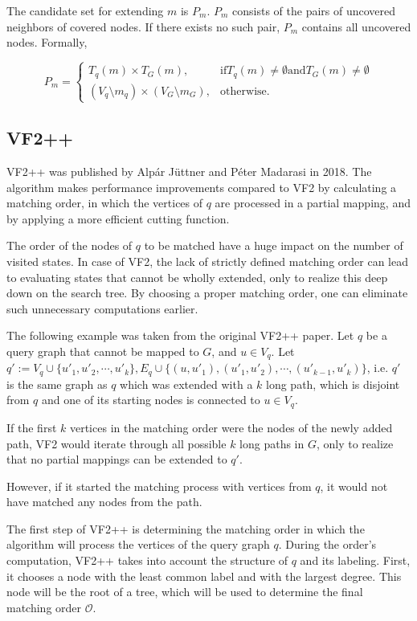 The candidate set for extending $m$ is $P_m$. $P_m$ consists of the pairs of uncovered neighbors
of covered nodes. If there exists no such pair, $P_m$ contains all uncovered nodes. Formally,

\[
    P_m = 
\begin{cases}
    T_q(m) \times T_G(m),& \text{if} T_q(m) \neq \emptyset \text{and} T_G(m) \neq \emptyset\\
    (V_q \setminus m_q) \times (V_G \setminus m_G),  & \text{otherwise}.
\end{cases}    
\]


\subsection{VF2++}

VF2++  was published by Alp\'{a}r J\"{u}ttner and P\'{e}ter Madarasi in 2018.
The algorithm makes performance improvements compared to VF2 by calculating a matching
order, in which the vertices of $q$ are processed in a partial mapping, and by applying
a more efficient cutting function.

The order of the nodes of $q$ to be matched have a huge impact on the number of visited
states. In case of VF2, the lack of strictly defined matching order can lead to evaluating
states that cannot be wholly extended, only to realize this deep down on the search tree.
By choosing a proper matching order, one can eliminate such unnecessary computations earlier.

\begin{example}
    The following example was taken from the original VF2++ paper. Let $q$ be a query graph 
    that cannot be mapped to $G$, and $u \in V_q$. Let 
    $q' := V_q \cup \{u'_1, u'_2,\cdots,u'_k\}, E_q \cup \{ (u, u'_1),(u'_1, u'_2),\cdots,(u'_{k-1}, u'_k) \}$,
    i.e. $q'$ is the same graph as $q$ which was extended with a $k$ long path, which is disjoint
    from $q$ and one of its starting nodes is connected to $u \in V_q$.

    If the first $k$ vertices in the matching order were the nodes of the newly added path,
    VF2 would iterate through all possible $k$ long paths in $G$, only to realize that no
    partial mappings can be extended to $q'$.

    However, if it started the matching process with vertices from $q$, it would not have
    matched any nodes from the path.
\end{example}


The first step of VF2++ is determining the matching order in which the algorithm will process
the vertices of the query graph $q$. During the order's computation, VF2++ takes into account
the structure of $q$ and its labeling. First, it chooses a node with the least common label 
and with the largest degree. This node will be the root of a tree, which will be used to determine
the final matching order $\mathcal{O}$.


